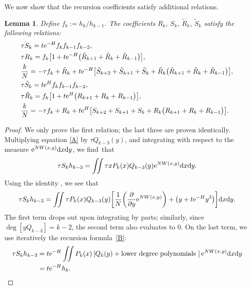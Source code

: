 \documentclass[10pt,a4paper]{amsart}
\numberwithin{equation}{section}
\newtheorem{Lemma}[Theorem]{Lemma}
\begin{document}
We now show that the recursion coefficients satisfy additional relations.
\begin{Lemma}
 Define $f_k := h_k/h_{k-1}$. The coefficients $R_k$, $S_k$, $\tilde{R}_k$, $\tilde{S}_k$ satisfy the following relations:
 \begin{align}
 &\tau S_k= t {\rm e}^{-H} f_k f_{k-1} f_{k-2},\label{S1}\\
 &\tau R_k= f_k\bigl[1 + t{\rm e}^{-H}\bigl(\tilde{R}_{k+1} + \tilde{R}_k + \tilde{R}_{k-1}\bigr)\bigr], \label{string1-A}\\
 &\frac{k}{N}= -\tau f_k + \tilde{R}_k + t{\rm e}^{-H}\bigl[\tilde{S}_{k+2} + \tilde{S}_{k+1} + \tilde{S}_{k} + \tilde{R}_k\bigl(\tilde{R}_{k+1} + \tilde{R}_{k} + \tilde{R}_{k-1}\bigr)\bigr],\\
 &\tau \tilde{S}_k= t {\rm e}^{H} f_k f_{k-1} f_{k-2},\\
 &\tau \tilde{R}_k= f_k\bigl[1 + t{\rm e}^{H}\bigl({R}_{k+1} + {R}_k + {R}_{k-1}\bigr)\bigr], \label{string1-B}\\
 &\frac{k}{N}= -\tau f_k + {R}_k + t{\rm e}^{H}\bigl[{S}_{k+2} + {S}_{k+1} + {S}_{k} + {R}_k\bigl({R}_{k+1} + {R}_{k} + {R}_{k-1}\bigr)\bigr]\label{f2}.
 \end{align}
\end{Lemma}
 \begin{proof}
 We only prove the first relation; the last three are proven identically. Multiplying equation \eqref{A} by $\tau Q_{k-3}(y)$, and integrating with respect to the measure ${\rm e}^{NW(x,y)}{\rm d}x{\rm d}y$, we find~that
 \begin{equation*}
 \tau S_k h_{k-3} = \iint \tau xP_k(x) Q_{k-3}(y) {\rm e}^{NW(x,y)}{\rm d}x{\rm d}y.
 \end{equation*}
 Using the identity , we see that
 \begin{equation*}
 \tau S_k h_{k-3} = \iint \tau P_k(x) Q_{k-3}(y) \biggl[\frac{1}{N}\biggl(\frac{\partial}{\partial y} {\rm e}^{NW(x,y)}\biggr) + \bigl(y + t{\rm e}^{-H}y^3\bigr)\biggr]{\rm d}x{\rm d}y.
 \end{equation*}
 The first term drops out upon integrating by parts; similarly, since $\deg [ y Q_{k-3}] = k-2$, the second term also evaluates to $0$. On the
 last term, we use iteratively the recursion formula~\eqref{B}:
 \begin{align*}
 \tau S_k h_{k-3} &{}= t {\rm e}^{-H} \iint P_k(x) \left[Q_k(y) + \text{lower degree polynomials }\right]{\rm e}^{NW(x,y)}{\rm d}x{\rm d}y \\
 &{}= t {\rm e}^{-H} h_k.
\tag*{\qed}
\end{align*}
\renewcommand{\qed}{}
\end{proof}
\end{document}
